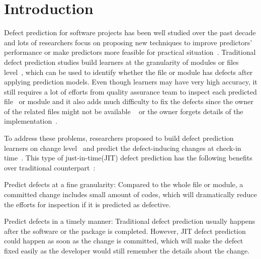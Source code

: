\section{Introduction}

Defect prediction for software projects has been well studied 
over the past decade and lots of researchers focus on proposing new techniques to improve predictors' performance
or make predictors more feasible for practical situation~\cite{lessmann2008benchmarking,hassan2009predicting,fu2016tuning,graves2000predicting,menzies2007data,hall2012systematic,nagappan2005use,jiang2013personalized,kim2007predicting,kim2008classifying,jing2014dictionary,lee2011micro,moser2008comparative,nam2013transfer,wang2016automatically,yang2016effort,kamei2013large}. 
Traditional defect prediction studies build learners at the granularity of  modules or files level~\cite{lessmann2008benchmarking,menzies2007data,nam2013transfer,wang2016automatically,fu2016tuning,hall2012systematic}, which can be
used to identify whether the file or module has defects after applying prediction models. 
Even though learners
may have very high accuracy, it still requires a lot of efforts from quality assurance team 
to inspect each predicted file~\cite{kamei2013large} or
module and it also adds much difficulty to fix the defects since 
the owner of the related files might not be available ~\cite{anvik2006should} or the owner forgets 
details of the implementation~\cite{weiss2007long}. 

To address these problems, researchers proposed to build defect prediction learners on change level~\cite{kim2008classifying,mockus2000predicting,sliwerski2005changes,shihab2012industrial} and predict the defect-inducing changes at check-in time~\cite{kamei2013large,fukushima2014empirical,yang2016effort}. This type of just-in-time(JIT) defect prediction
has the following benefits over traditional counterpart~\cite{kim2008classifying,kamei2013large}:
\bi
\item Predict defects at a fine granularity: Compared to the whole file or module, a committed change includes small amount of codes, which will dramatically reduce the efforts for inspection if it is predicted as defective.
\item Predict defects in a timely manner: Traditional defect prediction usually happens after the software or the package is completed. However, JIT defect prediction could happen as soon as the change is committed, which
will make the defect fixed easily as the developer would still remember the details about the change.
\ei


